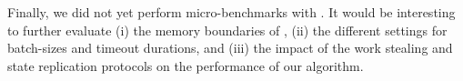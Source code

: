   Finally, we did not yet perform micro-benchmarks with \dodo{}.
  It would be interesting to further evaluate
  (i) the memory boundaries of \dodo{},
  (ii) the different settings for batch-sizes and timeout durations, and
  (iii) the impact of the work stealing and state replication protocols on the performance of our algorithm.

